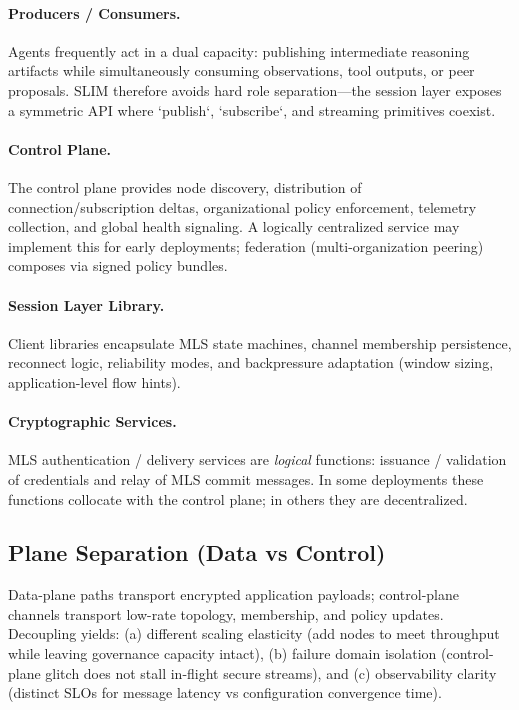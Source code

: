\documentclass{article}
\theoremstyle{definition}
\theoremstyle{remark}
\begin{document}
\paragraph{Producers / Consumers.} Agents frequently act in a dual capacity: publishing intermediate reasoning artifacts while simultaneously consuming observations, tool outputs, or peer proposals. SLIM therefore avoids hard role separation---the session layer exposes a symmetric API where `publish`, `subscribe`, and streaming primitives coexist.
\paragraph{Control Plane.} The control plane provides node discovery, distribution of connection/subscription deltas, organizational policy enforcement, telemetry collection, and global health signaling. A logically centralized service may implement this for early deployments; federation (multi-organization peering) composes via signed policy bundles.
\paragraph{Session Layer Library.} Client libraries encapsulate MLS state machines, channel membership persistence, reconnect logic, reliability modes, and backpressure adaptation (window sizing, application-level flow hints).
\paragraph{Cryptographic Services.} MLS authentication / delivery services are \emph{logical} functions: issuance / validation of credentials and relay of MLS commit messages. In some deployments these functions collocate with the control plane; in others they are decentralized.

\subsection{Plane Separation (Data vs Control)}
Data-plane paths transport encrypted application payloads; control-plane channels transport low-rate topology, membership, and policy updates. Decoupling yields: (a) different scaling elasticity (add nodes to meet throughput while leaving governance capacity intact), (b) failure domain isolation (control-plane glitch does not stall in-flight secure streams), and (c) observability clarity (distinct SLOs for message latency vs configuration convergence time).
\end{document}
